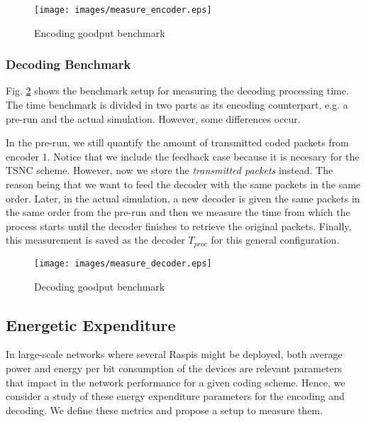 
\begin{figure}[ht!]
\centering
\texttt{[image: images/measure\_encoder.eps]}
\caption{Encoding goodput benchmark}
\label{fig:enc_goodput_benchmark}
\end{figure}

\subsubsection{Decoding Benchmark}
Fig. \ref{fig:dec_goodput_benchmark} shows the benchmark setup
for measuring the decoding processing time. The time benchmark
is divided in two parts as its encoding counterpart, e.g. a pre-run
and the actual simulation. However, some differences occur.

In the pre-run, we still quantify the amount of transmitted coded
packets from encoder 1. Notice that we include the feedback case because
it is necesary for the \ac{TSNC} scheme. However, now we store
the \textit{transmitted packets} instead. The reason being
that we want to feed the decoder with the same packets in the same
order. Later, in the actual simulation, a new decoder is given the
same packets in the same order from the pre-run and then we measure
the time from which the process starts until the decoder finishes to
retrieve the original packets. Finally, this measurement is saved as
the decoder $T_{proc}$ for this general configuration.

\begin{figure}[ht!]
\centering
\texttt{[image: images/measure\_decoder.eps]}
\caption{Decoding goodput benchmark}
\label{fig:dec_goodput_benchmark}
\end{figure}

\subsection{Energetic Expenditure}
\label{sec:energy_metrics_methods}
In large-scale networks where several \ac{Raspi}s might be deployed,
both average power and energy per bit consumption of the devices are
relevant parameters that impact in the network performance for a given
coding scheme. Hence, we consider a study of these energy expenditure
parameters for the encoding and decoding. We define these metrics
and propose a setup to measure them.

